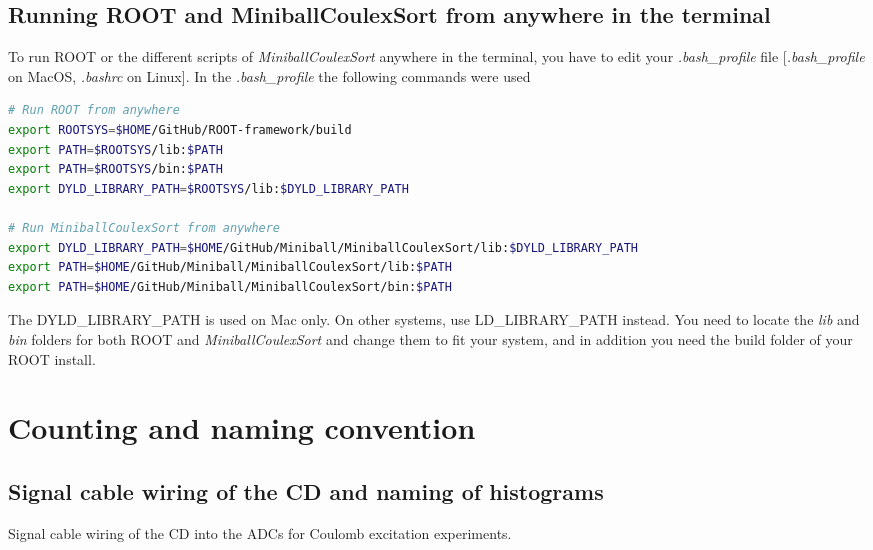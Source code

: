 \documentclass[twoside,english]{uiofysmaster/uiofysmaster}
\begin{document}
\begin{appendices}
\section{Running ROOT and MiniballCoulexSort from anywhere in the terminal}
To run ROOT or the different scripts of \textsl{MiniballCoulexSort} anywhere in the terminal, you have to edit your \textit{.bash\_profile} file [\textit{.bash\_profile} on MacOS, \textit{.bashrc} on Linux]. In the \textit{.bash\_profile} the following commands were used 
\begin{lstlisting}[language=sh]
# Run ROOT from anywhere
export ROOTSYS=$HOME/GitHub/ROOT-framework/build
export PATH=$ROOTSYS/lib:$PATH
export PATH=$ROOTSYS/bin:$PATH
export DYLD_LIBRARY_PATH=$ROOTSYS/lib:$DYLD_LIBRARY_PATH

# Run MiniballCoulexSort from anywhere
export DYLD_LIBRARY_PATH=$HOME/GitHub/Miniball/MiniballCoulexSort/lib:$DYLD_LIBRARY_PATH
export PATH=$HOME/GitHub/Miniball/MiniballCoulexSort/lib:$PATH
export PATH=$HOME/GitHub/Miniball/MiniballCoulexSort/bin:$PATH
\end{lstlisting}
The DYLD\_LIBRARY\_PATH is used on Mac only. On other systems, use \newline LD\_LIBRARY\_PATH instead. You need to locate the \textit{lib} and \textit{bin} folders for both ROOT and \textsl{MiniballCoulexSort} and change them to fit your system, and in addition you need the build folder of your ROOT install.



\chapter{Counting and naming convention}

\section{Signal cable wiring of the CD and naming of histograms}

\begin{table}[ht] 
	\centering 
	\caption{Signal cable wiring of the CD into the ADCs for Coulomb excitation experiments.}
	
	\label{tab:ADC}
\end{table}



\end{appendices}
\end{document}
